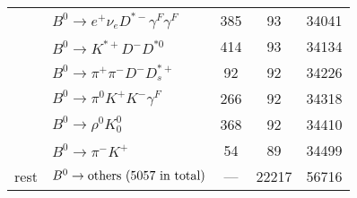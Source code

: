 \documentclass[landscape]{article}
\newcounter{rownumbers}
\newcommand\rn{\stepcounter{rownumbers}\arabic{rownumbers}}
\newcommand{\EOL}{\\} %
\newcommand{\topoTags}[1]{#1} %
\begin{document}
\begin{longtable}{clccc}
\rn & $ B^{0} \rightarrow e^{+} \nu_{e} D^{*-} \gamma^{F} \gamma^{F} $ & \topoTags{385 & }93 & 34041 \EOL

\rn & $ B^{0} \rightarrow K^{*+} D^{-} D^{*0} $ & \topoTags{414 & }93 & 34134 \EOL

\rn & $ B^{0} \rightarrow \pi^{+} \pi^{-} D^{-} D_{s}^{*+} $ & \topoTags{92 & }92 & 34226 \EOL

\rn & $ B^{0} \rightarrow \pi^{0} K^{+} K^{-} \gamma^{F} $ & \topoTags{266 & }92 & 34318 \EOL

\rn & $ B^{0} \rightarrow \rho^{0} K_0^{0} $ & \topoTags{368 & }92 & 34410 \EOL

\rn & $ B^{0} \rightarrow \pi^{-} K^{+} $ & \topoTags{54 & }89 & 34499 \EOL

rest & $ B^{0} \rightarrow \rm{others \  (5057 \  in \  total)} $ & \topoTags{--- & }22217 & 56716 \\ \hline

\end{longtable}

\clearpage
\end{document}
